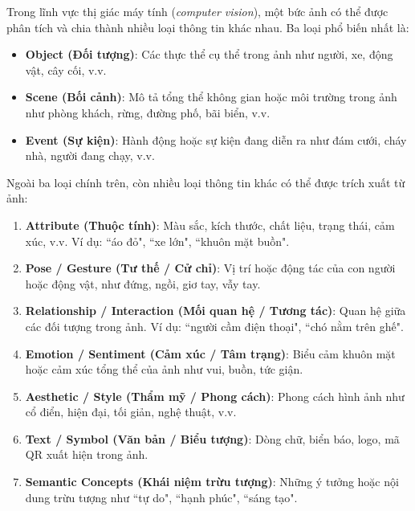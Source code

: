 \documentclass[12pt]{article}
\begin{document}
	Trong lĩnh vực thị giác máy tính (\textit{computer vision}), một bức ảnh có thể được phân tích và chia thành nhiều loại thông tin khác nhau. Ba loại phổ biến nhất là:
	
	\begin{itemize}
	\item \textbf{Object (Đối tượng)}: Các thực thể cụ thể trong ảnh như người, xe, động vật, cây cối, v.v.
	\item \textbf{Scene (Bối cảnh)}: Mô tả tổng thể không gian hoặc môi trường trong ảnh như phòng khách, rừng, đường phố, bãi biển, v.v.
	\item \textbf{Event (Sự kiện)}: Hành động hoặc sự kiện đang diễn ra như đám cưới, cháy nhà, người đang chạy, v.v.
	\end{itemize}
	
	Ngoài ba loại chính trên, còn nhiều loại thông tin khác có thể được trích xuất từ ảnh:
	
	\begin{enumerate}[label=\textbf{\arabic*.}]
	\item \textbf{Attribute (Thuộc tính)}: Màu sắc, kích thước, chất liệu, trạng thái, cảm xúc, v.v. Ví dụ: ``áo đỏ", ``xe lớn", ``khuôn mặt buồn".
	
	\item \textbf{Pose / Gesture (Tư thế / Cử chỉ)}: Vị trí hoặc động tác của con người hoặc động vật, như đứng, ngồi, giơ tay, vẫy tay.
	
	\item \textbf{Relationship / Interaction (Mối quan hệ / Tương tác)}: Quan hệ giữa các đối tượng trong ảnh. Ví dụ: ``người cầm điện thoại", ``chó nằm trên ghế".
	
	\item \textbf{Emotion / Sentiment (Cảm xúc / Tâm trạng)}: Biểu cảm khuôn mặt hoặc cảm xúc tổng thể của ảnh như vui, buồn, tức giận.
	
	\item \textbf{Aesthetic / Style (Thẩm mỹ / Phong cách)}: Phong cách hình ảnh như cổ điển, hiện đại, tối giản, nghệ thuật, v.v.
	
	\item \textbf{Text / Symbol (Văn bản / Biểu tượng)}: Dòng chữ, biển báo, logo, mã QR xuất hiện trong ảnh.
	
	\item \textbf{Semantic Concepts (Khái niệm trừu tượng)}: Những ý tưởng hoặc nội dung trừu tượng như ``tự do", ``hạnh phúc", ``sáng tạo".
	\end{enumerate}
	
\end{document}
